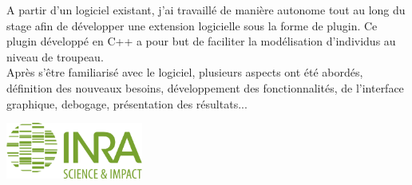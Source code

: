 \begin{titlepage}
\begin{center}
A partir d'un logiciel existant, j'ai travaillé de manière autonome tout au long du stage afin de développer une extension logicielle sous la forme de plugin. Ce plugin développé en C++ a pour but de faciliter la modélisation d'individus au niveau de troupeau.\\
Après s'être familiarisé avec le logiciel, plusieurs aspects ont été abordés, définition des nouveaux besoins, développement des fonctionnalités, de l'interface graphique, debogage, présentation des résultats...
\vfill

\center
\vspace*{0.2cm}
\includegraphics [width=45mm]{images/logoINRA.jpg} \\[0.6cm]
\end{center}

\end{titlepage}
